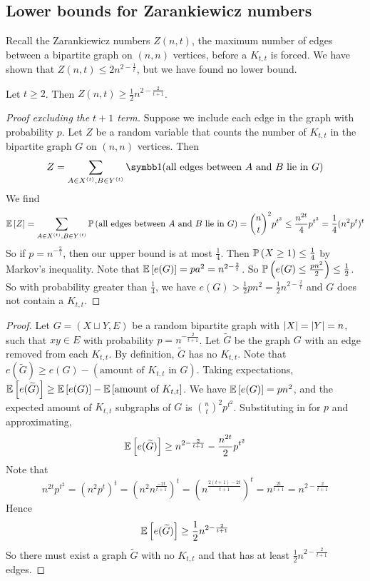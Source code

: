 \subsection{Lower bounds for Zarankiewicz numbers}
Recall the Zarankiewicz numbers \( Z(n,t) \), the maximum number of edges between a bipartite graph on \( (n, n) \) vertices, before a \( K_{t,t} \) is forced.
We have shown that \( Z(n,t) \leq 2n^{2 - \frac 1t} \), but we have found no lower bound.
\begin{theorem}
	Let \( t \geq 2 \).
	Then \( Z(n,t) \geq \frac{1}{2} n^{2 - \frac{2}{t+1}} \).
\end{theorem}
\begin{proof}[Proof excluding the \( t + 1 \) term]
	Suppose we include each edge in the graph with probability \( p \).
	Let \( Z \) be a random variable that counts the number of \( K_{t,t} \) in the bipartite graph \( G \) on \( (n, n) \) vertices.
	Then
	\[ Z = \sum_{A \in X^{(t)}, B \in Y^{(t)}} \symbb 1(\text{all edges between \( A \) and \( B \) lie in \( G \)}) \]
	We find
	\[ \mathbb{E}\left[{Z}\right] = \sum_{A \in X^{(t)}, B \in Y^{(t)}} \mathbb{P}\left({\text{all edges between \( A \) and \( B \) lie in \( G \)}}\right) = {\binom n t}^2 p^{t^2} \leq \frac{n^{2t}}{4} p^{t^2} = \frac{1}{4} (n^2 p^t)^t \]
	So if \( p = n^{-\frac{2}{t}} \), then our upper bound is at most \( \frac{1}{4} \).
	Then \( \mathbb{P}\left({X \geq 1}\right) \leq \frac{1}{4} \) by Markov's inequality.
	Note that \( \mathbb{E}\left[{e(G)}\right] = pa^2 = n^{2 - \frac 2 t} \).
	So \( \mathbb{P}\left({e(G) \leq \frac{pn^2}{2}}\right) \leq \frac{1}{2} \).
	So with probability greater than \( \frac 14 \), we have \( e(G) > \frac{1}{2} pn^2 = \frac{1}{2} n^{2 - \frac{2}{t}} \) and \( G \) does not contain a \( K_{t,t} \).
\end{proof}
\begin{proof}
	Let \( G = (X \sqcup Y, E) \) be a random bipartite graph with \( \abs{X} = \abs{Y} = n \), such that \( xy \in E \) with probability \( p = n^{-\frac{2}{t+1}} \).
	Let \( \widetilde G \) be the graph \( G \) with an edge removed from each \( K_{t,t} \).
	By definition, \( \widetilde G \) has no \( K_{t,t} \).
	Note that \( e(\widetilde G) \geq e(G) - (\text{amount of } K_{t,t} \text{ in } G) \).
	Taking expectations, \( \mathbb{E}\left[{e(\widetilde G)}\right] \geq \mathbb{E}\left[{e(G)}\right] - \mathbb{E}\left[{\text{amount of } K_{t,t}}\right] \).
	We have \( \mathbb{E}\left[{e(G)}\right] = pn^2 \), and the expected amount of \( K_{t,t} \) subgraphs of \( G \) is \( {\binom n t}^2 p^{t^2} \).
	Substituting in for \( p \) and approximating,
	\[ \mathbb{E}\left[{e(\widetilde G)}\right] \geq n^{2-\frac{2}{t+1}} - \frac{n^{2t}}{2} p^{t^2} \]
	Note that
	\[ n^{2t} p^{t^2} = (n^2 p^t)^t = (n^2 n^{\frac{-2t}{t+1}})^t = (n^{\frac{2(t+1) - 2t}{t+1}})^t = n^{\frac{2t}{t+1}} = n^{2 - \frac{2}{t+1}} \]
	Hence
	\[ \mathbb{E}\left[{e(\widetilde G)}\right] \geq \frac{1}{2} n^{2 - \frac{2}{t+1}} \]
	So there must exist a graph \( \widetilde G \) with no \( K_{t,t} \) and that has at least \( \frac{1}{2} n^{2 - \frac{2}{t+1}} \) edges.
\end{proof}

